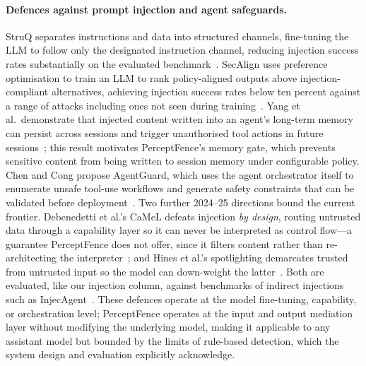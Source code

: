 \documentclass[pdflatex,sn-mathphys-num]{sn-jnl}
\begin{document}
\paragraph{Defences against prompt injection and agent safeguards.}
StruQ separates instructions and data into structured channels, fine-tuning the
LLM to follow only the designated instruction channel, reducing injection
success rates substantially on the evaluated benchmark~\cite{chen2025struq}.
SecAlign uses preference optimisation to train an LLM to rank policy-aligned
outputs above injection-compliant alternatives, achieving injection success
rates below ten percent against a range of attacks including ones not seen
during training~\cite{chen2025secalign}.
Yang et al.\ demonstrate that injected content written into an agent's
long-term memory can persist across sessions and trigger unauthorised tool
actions in future sessions~\cite{yang2026zombie}; this result motivates
PerceptFence's memory gate, which prevents sensitive content from being
written to session memory under configurable policy.
Chen and Cong propose AgentGuard, which uses the agent orchestrator itself to
enumerate unsafe tool-use workflows and generate safety constraints that can
be validated before deployment~\cite{chen2025agentguard}.
Two further 2024--25 directions bound the current frontier. Debenedetti et al.'s
CaMeL defeats injection \textit{by design}, routing untrusted data through a
capability layer so it can never be interpreted as control flow---a guarantee
PerceptFence does not offer, since it filters content rather than re-architecting
the interpreter~\cite{debenedetti2025camel}; and Hines et al.'s spotlighting
demarcates trusted from untrusted input so the model can down-weight the
latter~\cite{hines2024spotlighting}. Both are evaluated, like our injection
column, against benchmarks of indirect injections such as
InjecAgent~\cite{zhan2024injecagent}.
These defences operate at the model fine-tuning, capability, or orchestration
level; PerceptFence operates at the input and output mediation layer without
modifying the underlying model, making it applicable to any assistant model but
bounded by the limits of rule-based detection, which the system design and
evaluation explicitly acknowledge.
\end{document}
